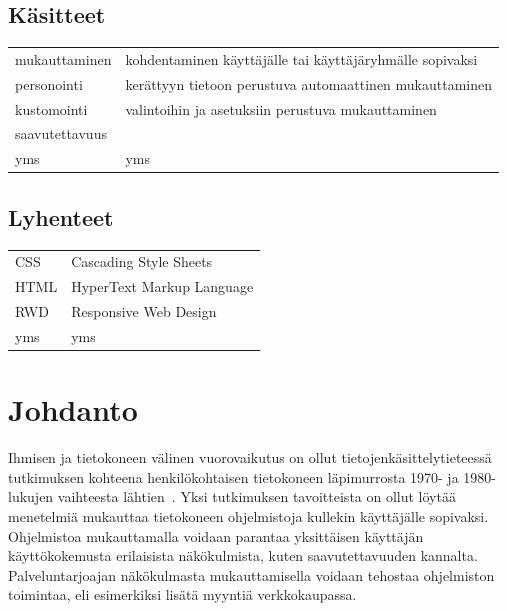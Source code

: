 \documentclass[finnish, 12pt, a4paper, elec, utf8, a-1b, online]{aaltothesis}
\date{xx.xx.2022}
\begin{document}
\makecoverpage{}

\makecopyrightpage{}

\begin{abstractpage}[finnish]
\end{abstractpage}

\thesistableofcontents{}


\subsection*{Käsitteet}

\begin{tabular}{ll}
    mukauttaminen & kohdentaminen käyttäjälle tai käyttäjäryhmälle sopivaksi \\
    personointi   & kerättyyn tietoon perustuva automaattinen mukauttaminen  \\
    kustomointi   & valintoihin ja asetuksiin perustuva mukauttaminen        \\
    saavutettavuus & \\
    yms           & yms
\end{tabular}

\subsection*{Lyhenteet}

\begin{tabular}{ll}
    CSS  & Cascading Style Sheets    \\
    HTML & HyperText Markup Language \\
    RWD  & Responsive Web Design     \\
    yms  & yms
\end{tabular}

\cleardoublepage{}
\section{Johdanto}

Ihmisen ja tietokoneen välinen vuorovaikutus on ollut tietojenkäsittelytieteessä
tutkimuksen kohteena henkilökohtaisen tietokoneen läpimurrosta 1970- ja
1980-lukujen vaihteesta lähtien~\cite{10.1145/800178.810088}. Yksi tutkimuksen
tavoitteista on ollut löytää menetelmiä mukauttaa tietokoneen ohjelmistoja
kullekin käyttäjälle sopivaksi. Ohjelmistoa mukauttamalla voidaan parantaa
yksittäisen käyttäjän käyttökokemusta erilaisista näkökulmista, kuten
saavutettavuuden kannalta. Palveluntarjoajan näkökulmasta mukauttamisella
voidaan tehostaa ohjelmiston toimintaa, eli esimerkiksi lisätä myyntiä
verkkokaupassa.
\end{document}
